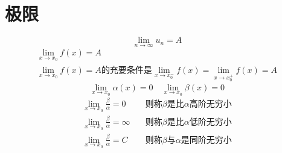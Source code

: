 \documentclass{ctexart}
\begin{document}
\section{极限}
\begin{equation*}
\lim_{n \to \infty} u_n = A
\end{equation*}
\begin{gather*}
\lim_{x \to x_0} f(x) = A \\
\lim_{x \to x_0} f(x) = A \text{的充要条件是}\lim_{x \to x_0^-} f(x) = \lim_{x \to x_0^+} f(x) = A
\end{gather*}
\begin{equation*}
\lim_{x \to x_0} \alpha(x) = 0 \quad \lim_{x \to x_0} \beta(x) = 0
\end{equation*}
\begin{align*}
\lim_{x \to x_0}\frac{\beta}{\alpha}=0 \quad &\text{则称$\beta$是比$\alpha$高阶无穷小} \\
\lim_{x \to x_0}\frac{\beta}{\alpha}=\infty \quad &\text{则称$\beta$是比$\alpha$低阶无穷小} \\
\lim_{x \to x_0}\frac{\beta}{\alpha}=C \quad &\text{则称$\beta$与$\alpha$是同阶无穷小}
\end{align*}
\end{document}
